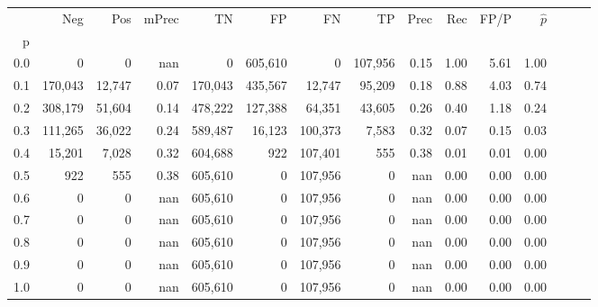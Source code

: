\begin{tabular}{rrrrrrrrrrrrrrr}
\toprule
{} &      Neg &     Pos & mPrec &       TN &       FP &       FN &       TP &  Prec &   Rec &  FP/P & $\hat{p}$ \\
p   &          &         &       &          &          &          &          &       &       &       &           \\
\midrule
0.0 &        0 &       0 &   nan &        0 &  605,610 &        0 &  107,956 &  0.15 &  1.00 &  5.61 &      1.00 \\
0.1 &  170,043 &  12,747 &  0.07 &  170,043 &  435,567 &   12,747 &   95,209 &  0.18 &  0.88 &  4.03 &      0.74 \\
0.2 &  308,179 &  51,604 &  0.14 &  478,222 &  127,388 &   64,351 &   43,605 &  0.26 &  0.40 &  1.18 &      0.24 \\
0.3 &  111,265 &  36,022 &  0.24 &  589,487 &   16,123 &  100,373 &    7,583 &  0.32 &  0.07 &  0.15 &      0.03 \\
0.4 &   15,201 &   7,028 &  0.32 &  604,688 &      922 &  107,401 &      555 &  0.38 &  0.01 &  0.01 &      0.00 \\
0.5 &      922 &     555 &  0.38 &  605,610 &        0 &  107,956 &        0 &   nan &  0.00 &  0.00 &      0.00 \\
0.6 &        0 &       0 &   nan &  605,610 &        0 &  107,956 &        0 &   nan &  0.00 &  0.00 &      0.00 \\
0.7 &        0 &       0 &   nan &  605,610 &        0 &  107,956 &        0 &   nan &  0.00 &  0.00 &      0.00 \\
0.8 &        0 &       0 &   nan &  605,610 &        0 &  107,956 &        0 &   nan &  0.00 &  0.00 &      0.00 \\
0.9 &        0 &       0 &   nan &  605,610 &        0 &  107,956 &        0 &   nan &  0.00 &  0.00 &      0.00 \\
1.0 &        0 &       0 &   nan &  605,610 &        0 &  107,956 &        0 &   nan &  0.00 &  0.00 &      0.00 \\
\bottomrule
\end{tabular}
